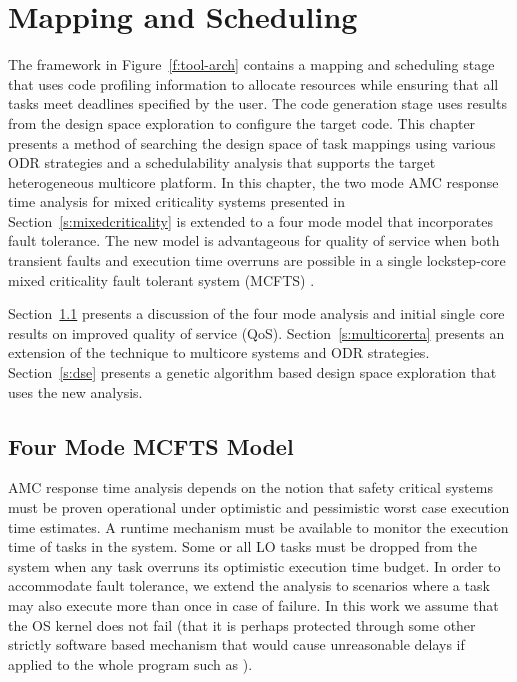 
\chapter{Mapping and Scheduling} %

\label{c:sched} %


	The framework in Figure~\ref{f:tool-arch} contains a mapping and scheduling stage that uses code profiling information to allocate resources while ensuring that all tasks meet deadlines specified by the user. 
	The code generation stage uses results from the design space exploration to configure the target code.
	This chapter presents a method of searching the design space of task mappings using various ODR strategies and a schedulability analysis that supports the target heterogeneous multicore platform.	In this chapter, the two mode AMC response time analysis for mixed criticality systems presented in Section~\ref{s:mixedcriticality} is extended to a four mode model that incorporates fault tolerance. 
	The new model is advantageous for quality of service when both transient faults and execution time overruns are possible in a single lockstep-core mixed criticality fault tolerant system (MCFTS) \cite{albayati2016modes}.
	 
	Section~\ref{s:mcfts} presents a discussion of the four mode analysis and initial single core results on improved quality of service (QoS).
	Section~\ref{s:multicorerta} presents an extension of the technique to multicore systems and ODR strategies. 
	Section~\ref{s:dse} presents a genetic algorithm based design space exploration that uses the new analysis.

\section{Four Mode MCFTS Model}
\label{s:mcfts}
	AMC response time analysis depends on the notion that safety critical systems must be proven operational under optimistic and pessimistic worst case execution time estimates. 
	A runtime mechanism must be available to monitor the execution time of tasks in the system.
	Some or all LO tasks must be dropped from the system when any task overruns its optimistic execution time budget.
	In order to accommodate fault tolerance, we extend the analysis to scenarios where a task may also execute more than once in case of failure.
	In this work we assume that the OS kernel does not fail (that it is perhaps protected through some other strictly software based mechanism that would cause unreasonable delays if applied to the whole program such as \cite{reis2005swift}).
	

